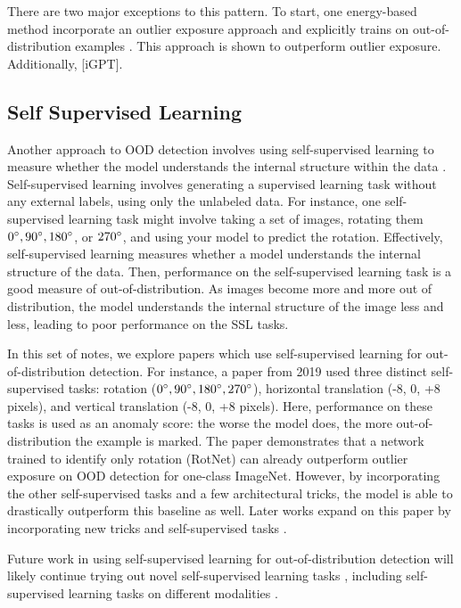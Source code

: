 \documentclass{article}
\begin{document}
There are two major exceptions to this pattern. To start, one energy-based method incorporate an outlier exposure approach and explicitly trains on out-of-distribution examples \cite{liu2021energybased}. This approach is shown to outperform outlier exposure. Additionally, [iGPT].

\subsection{Self Supervised Learning}
Another approach to OOD detection involves using self-supervised learning to measure whether the model understands the internal structure within the data \cite{hendrycks2019using, tack2020csi, yoon2021self}. Self-supervised learning involves generating a supervised learning task without any external labels, using only the unlabeled data. For instance, one self-supervised learning task might involve taking a set of images, rotating them $0 \degree, 90 \degree, 180 \degree$, or $270\degree$, and using your model to predict the rotation. Effectively, self-supervised learning measures whether a model understands the internal structure of the data. Then, performance on the self-supervised learning task is a good measure of out-of-distribution. As images become more and more out of distribution, the model understands the internal structure of the image less and less, leading to poor performance on the SSL tasks.

In this set of notes, we explore papers which use self-supervised learning for out-of-distribution detection. For instance, a paper from 2019 \cite{hendrycks2019using} used three distinct self-supervised tasks: rotation ($0 \degree, 90 \degree, 180 \degree, 270 \degree$), horizontal translation (-8, 0, +8 pixels), and vertical translation (-8, 0, +8 pixels). Here, performance on these tasks is used as an anomaly score: the worse the model does, the more out-of-distribution the example is marked. The paper demonstrates that a network trained to identify only rotation (RotNet) can already outperform outlier exposure on OOD detection for one-class ImageNet. However, by incorporating the other self-supervised tasks and a few architectural tricks, the model is able to drastically outperform this baseline as well. Later works expand on this paper by incorporating new tricks and self-supervised tasks \cite{tack2020csi, yoon2021self}.

Future work in using self-supervised learning for out-of-distribution detection will likely continue trying out novel self-supervised learning tasks \cite{he2021masked}, including self-supervised learning tasks on different modalities \cite{devlin2019bert}. 
\end{document}
